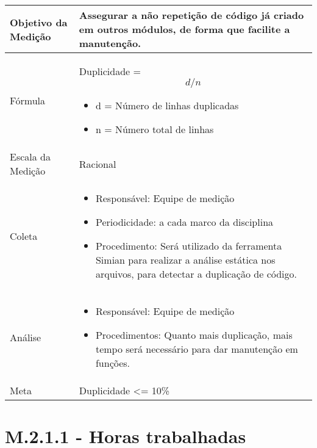 	\begin{tabular}{ |p{4cm}|p{8cm}|  }
	 \hline
	 Objetivo da Medição 		& 	Assegurar a não repetição de código já criado em outros módulos, de forma que facilite a manutenção.   \\
	 \hline
	 Fórmula		& 	Duplicidade = \[d / n\]	\begin{itemize} \item d = Número de linhas duplicadas \item n = Número total de linhas \end{itemize}\\
	 \hline
	 Escala da Medição 		& Racional		 \\
	 \hline
	 Coleta		& 	\begin{itemize} \item Responsável: Equipe de medição \item Periodicidade: a cada marco da disciplina \item Procedimento: Será utilizado da ferramenta Simian para realizar a análise estática nos arquivos, para detectar a duplicação de código.\end{itemize}	\\
	 \hline
	 Análise		& 	\begin{itemize} \item Responsável: Equipe de medição \item Procedimentos: Quanto mais duplicação, mais tempo será necessário para dar manutenção em funções. \end{itemize}	 \\
	 \hline
	 Meta		& 	Duplicidade <= 10\%	 \\
	 \hline
	\end{tabular}

\section{M.2.1.1 - Horas trabalhadas} %

